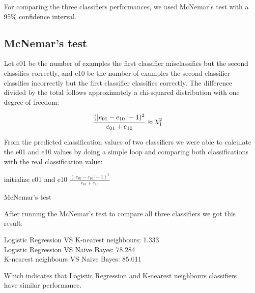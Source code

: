 \documentclass[a4paper]{article}
\DeclareRobustCommand{\rchi}{{\mathpalette\irchi\relax}}
\newcommand{\irchi}[2]{\raisebox{\depth}{$#1\chi$}}
\begin{document}
\bigbreak
For comparing the three classifiers performances, we used McNemar's test with a 95\% confidence interval.

\subsection{McNemar's test}
Let e01 be the number of examples the first classifier
misclassifies but the second classifies correctly, and e10 be the number of examples the second classifier
classifies incorrectly but the first classifier classifies correctly. The difference divided by the total
follows approximately a chi-squared distribution with one degree of freedom:

\begin{equation}
\frac{(|e_{01} - e_{10}| - 1)^2}{e_{01}+e_{10}}\approx\rchi^2_{1}
\end{equation}

From the predicted classification values of two classifiers we were able to calculate the e01 and e10 values by 
doing a simple loop and comparing both classifications with the real classification value:\\

\begin{algorithm}[H]
	initialize e01 and e10\;
	\Return $\frac{(|e_{01} - e_{10}| - 1)^2}{e_{01}+e_{10}}$
	\caption{McNemar's test}
\end{algorithm}
\bigbreak

After running the McNemar's test to compare all three classifiers we got this result:\\
\begin{center}
Logistic Regression VS K-nearest neighbours: 1.333\\
Logistic Regression VS Naive Bayes: 78.284\\
K-nearest neighbours VS Naive Bayes: 85.011
\end{center}

Which indicates that Logistic Regression and K-nearest neighbours classifiers have similar performance.
\end{document}
